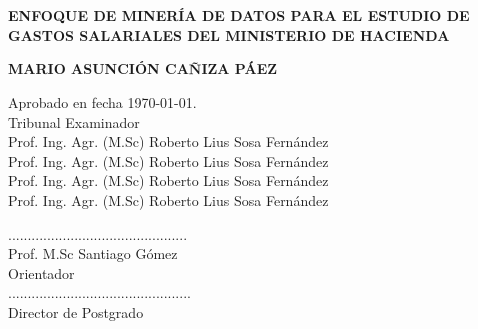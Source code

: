 \chapter*{}
\thispagestyle{empty}
\begin{large}
	\centering \textbf{ENFOQUE DE MINER\'IA DE DATOS PARA EL ESTUDIO DE 	 GASTOS SALARIALES DEL MINISTERIO DE HACIENDA} \\
\end{large}
\vspace{1,5cm}
\begin{large}
	\centering \textbf{MARIO ASUNCI\'ON CAÑIZA P\'AEZ}\\
    \vspace{1,5cm}
\end{large}
\begin{flushleft}
	Aprobado en fecha \today. \\
	\vspace{1,5cm}
	Tribunal Examinador\\
	\vspace{1,5cm}
	Prof. Ing. Agr. (M.Sc) Roberto Lius Sosa Fern\'andez\\
	Prof. Ing. Agr. (M.Sc) Roberto Lius Sosa Fern\'andez\\
	Prof. Ing. Agr. (M.Sc) Roberto Lius Sosa Fern\'andez\\
	Prof. Ing. Agr. (M.Sc) Roberto Lius Sosa Fern\'andez\\
\end{flushleft}

\begin{flushright}
	\vspace{1,5cm}
	..............................................\\
	Prof. M.Sc Santiago G\'omez\\ 				
    Orientador\\
	\vspace{1,5cm}
	...............................................\\
	Director de Postgrado\\
\end{flushright}


